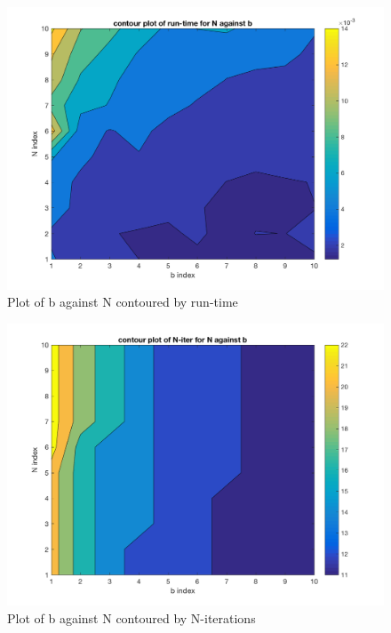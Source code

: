 \documentclass[paper=a4, fontsize=12pt]{scrartcl} %
\numberwithin{equation}{section}       %
\numberwithin{figure}{section}         %
\numberwithin{table}{section}          %
\begin{document}
\begin{center}
	\begin{figure}[h!]
	  \includegraphics[width=\linewidth]{mastq4time}
	  \caption{Plot of b against N contoured by run-time }
	  \label{fig:mas1}
	\end{figure}
\end{center}

\begin{center}
	\begin{figure}[h!]
	  \includegraphics[width=\linewidth]{mastq4iter}
	  \caption{Plot of b against N contoured by N-iterations}
	  \label{fig:mas2}
	\end{figure}
\end{center}
\end{document}
